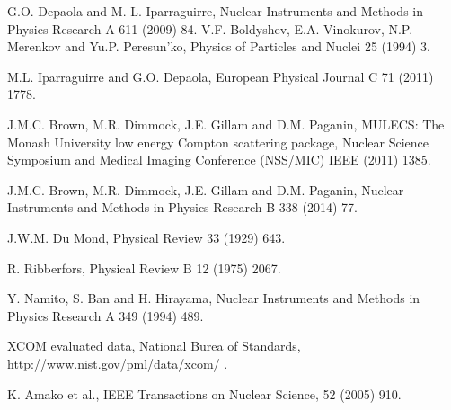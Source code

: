  G.O. Depaola and M. L. Iparraguirre,
                        Nuclear Instruments and Methods in Physics Research A 611 (2009) 84.
 V.F. Boldyshev, E.A. Vinokurov, N.P. Merenkov and Yu.P. Peresun'ko,
                     Physics of Particles and Nuclei 25 (1994) 3.

 M.L. Iparraguirre and G.O. Depaola,
                     European Physical Journal C 71 (2011) 1778.

 J.M.C. Brown, M.R. Dimmock, J.E. Gillam and D.M. Paganin,
                        MULECS: The Monash University low energy Compton
                        scattering package, Nuclear Science Symposium and Medical
                        Imaging Conference (NSS/MIC) IEEE (2011) 1385.

 J.M.C. Brown, M.R. Dimmock, J.E. Gillam and D.M. Paganin,
                        Nuclear Instruments and Methods in Physics Research B 338 (2014) 77.

 J.W.M. Du Mond,
                        Physical Review 33 (1929) 643.

 R. Ribberfors,
                       Physical Review B 12 (1975) 2067.

 Y. Namito, S. Ban and H. Hirayama,
                       Nuclear Instruments and Methods in Physics Research A 349 (1994) 489.

 XCOM evaluated data, National Burea of Standards, \\
                        \url{http://www.nist.gov/pml/data/xcom/} .  

K. Amako et al.,
                       IEEE Transactions on Nuclear Science, 52 (2005) 910.

